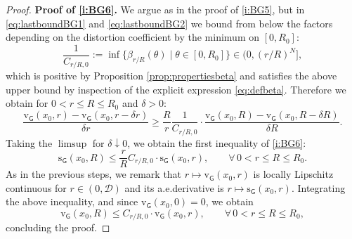 \documentclass[11pt,a4paper]{article}
\theoremstyle{plain}
\theoremstyle{definition}
\theoremstyle{remark}
\numberwithin{equation}{section}
\newcommand{\cD}{\mathcal{D}}
\newcommand{\rv}{\mathrm{v}}
\newcommand{\rs}{\mathrm{s}}
\newcommand{\sfG}{\mathsf G}
\begin{document}
\begin{proof}
\textbf{Proof of \ref{i:BG6}.} We argue as in the proof of \ref{i:BG5}, but in \eqref{eq:lastboundBG1} and \eqref{eq:lastboundBG2} we bound from below the factors depending on the distortion coefficient by the minimum on $[0,R_0]$:
\begin{equation}
\frac{1}{C_{r/R,0}}:=\inf\{\beta_{r/R}(\theta)\mid \theta \in [0,R_0]\} \in (0,(r/R)^N],
\end{equation}
which is positive by Proposition \ref{prop:propertiesbeta} and satisfies the above upper bound by inspection of the explicit expression \eqref{eq:defbeta}. Therefore we obtain for $0<r\leq R\leq R_0$ and $\delta>0$:
\begin{equation}
\frac{\rv_{\sfG}(x_0,r) -\rv_{\sfG}(x_0,r-\delta r)}{\delta r}   \geq \frac{R}{r} \frac{1}{C_{r/R,0}}\cdot \frac{\rv_{\sfG}(x_0,R) -\rv_{\sfG}(x_0,R-\delta R)}{\delta R}.
\end{equation}
Taking the $\limsup$ for $\delta \downarrow 0$, we obtain the first inequality of \ref{i:BG6}:
\begin{equation}
 \rs_{\sfG}(x_0,R) \leq \frac{r}{R}C_{r/R,0}\cdot \rs_{\sfG}(x_0,r), \qquad \forall \, 0<r\leq R \leq R_0.
\end{equation}
As in the previous steps, we remark that $r\mapsto \rv_{\sfG}(x_0,r)$ is locally Lipschitz continuous for $r\in (0,\cD)$ and its a.e.\@ derivative is $r\mapsto\rs_{\sfG}(x_0,r)$. Integrating the above inequality, and since $\rv_{\sfG}(x_0,0)=0$, we obtain
\begin{equation}
\rv_{\sfG}(x_0,R) \leq C_{r/R,0}\cdot \rv_{\sfG}(x_0, r), \qquad \forall\, 0<r \leq R \leq R_0,
\end{equation}
concluding the proof.
\end{proof}

\end{document}
